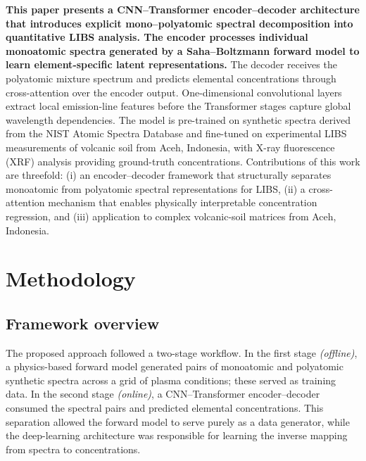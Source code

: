 \documentclass{iopjournal}
\begin{document}
\textbf{This paper presents a CNN--Transformer encoder--decoder architecture that introduces explicit mono--polyatomic spectral decomposition into quantitative LIBS analysis. The encoder processes individual monoatomic spectra generated by a Saha--Boltzmann forward model to learn element-specific latent representations.} The decoder receives the polyatomic mixture spectrum and predicts elemental concentrations through cross-attention over the encoder output. One-dimensional convolutional layers extract local emission-line features before the Transformer stages capture global wavelength dependencies. The model is pre-trained on synthetic spectra derived from the NIST Atomic Spectra Database and fine-tuned on experimental LIBS measurements of volcanic soil from Aceh, Indonesia, with X-ray fluorescence (XRF) analysis providing ground-truth concentrations. Contributions of this work are threefold: (i) an encoder--decoder framework that structurally separates monoatomic from polyatomic spectral representations for LIBS, (ii) a cross-attention mechanism that enables physically interpretable concentration regression, and (iii) application to complex volcanic-soil matrices from Aceh, Indonesia.


\section{Methodology}

\subsection{Framework overview}

The proposed approach followed a two-stage workflow.
In the first stage \emph{(offline)}, a physics-based forward model generated pairs of monoatomic and polyatomic synthetic spectra across a grid of plasma conditions; these served as training data.
In the second stage \emph{(online)}, a CNN--Transformer encoder--decoder consumed the spectral pairs and predicted elemental concentrations.
This separation allowed the forward model to serve purely as a data generator, while the deep-learning architecture was responsible for learning the inverse mapping from spectra to concentrations.
\end{document}
